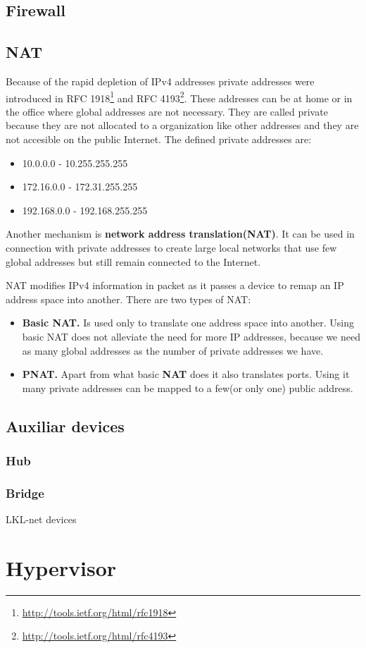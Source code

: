 \subsection{Firewall}
\label{sub-sec:firewall}

\subsection{NAT}
\label{sub-sec:nat}

Because of the rapid depletion of IPv4 addresses private addresses were introduced in RFC 1918\footnote{\url{http://tools.ietf.org/html/rfc1918}}
 and RFC 4193\footnote{\url{http://tools.ietf.org/html/rfc4193}}. These addresses can be at home or in the office
where global addresses are not necessary. They are called private because they are not allocated to a organization like
other addresses and they are not accesible on the public Internet. The defined private addresses are:
\begin{itemize}
  \item 10.0.0.0 - 10.255.255.255
  \item 172.16.0.0 - 172.31.255.255
  \item 192.168.0.0 - 192.168.255.255
\end{itemize}

Another mechanism is \textbf{network address translation(NAT)}. It can be used in connection with private addresses to create
large local networks that use few global addresses but still remain connected to the Internet. 

NAT modifies IPv4 information in packet as it passes a device to remap an IP address space into another. There are two types of
NAT:
\begin{itemize}
  \item \textbf{Basic NAT.} Is used only to translate one address space into another. Using basic NAT does not alleviate the need
for more IP addresses, because we need as many global addresses as the number of private addresses we have.
  \item \textbf{PNAT.} Apart from what basic \textbf{NAT} does it also translates ports. Using it many private addresses can be mapped
to a few(or only one) public address.
\end{itemize}


\subsection{Auxiliar devices}
\label{sub-sec:auxdev}

\subsubsection{Hub}

\subsubsection{Bridge}

\begin{center}
  \begin{table}[htb]
    \caption{LKL-net devices}
    \label{table:tdevices}
  \end{table}
\end{center}

\section{Hypervisor}
\label{sub-sec:hypervisor}
